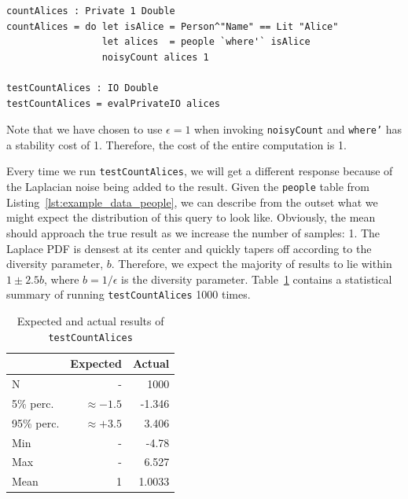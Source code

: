 \documentclass[12pt]{article}
\begin{document}
\begin{lstlisting}
countAlices : Private 1 Double
countAlices = do let isAlice = Person^"Name" == Lit "Alice"
                 let alices  = people `where'` isAlice
                 noisyCount alices 1

testCountAlices : IO Double
testCountAlices = evalPrivateIO alices
\end{lstlisting}

Note that we have chosen to use $\epsilon = 1$ when invoking \texttt{noisyCount} and \texttt{where'} has a stability cost of 1.
Therefore, the cost of the entire computation is 1.

Every time we run \texttt{testCountAlices}, we will get a different response because of the Laplacian noise being added to the result.
Given the \texttt{people} table from Listing~\ref{lst:example_data_people}, we can describe from the outset what we might expect the distribution of this query to look like.
Obviously, the mean should approach the true result as we increase the number of samples: 1.
The Laplace PDF is densest at its center and quickly tapers off according to the diversity parameter, $b$.
Therefore, we expect the majority of results to lie within $1 \pm 2.5b$, where $b=1/\epsilon$ is the diversity parameter.
Table~\ref{tab:testCountAlices_results} contains a statistical summary of running \texttt{testCountAlices} 1000 times.

\begin{table}[h!]
  \caption{Expected and actual results of \texttt{testCountAlices}}
  \label{tab:testCountAlices_results}
  \centering

  \begin{tabular}{|l|rr|}
  \hline

  \hline
  \textbf{} & \textbf{Expected} & \textbf{Actual} \\
  \hline
    N          &             -  &   1000 \\
    5\% perc.  & $\approx -1.5$ & -1.346 \\
    95\% perc. & $\approx +3.5$ &  3.406 \\
    Min        &             -  &  -4.78 \\
    Max        &             -  &  6.527 \\
    Mean       &             1  & 1.0033 \\
  \hline

  \hline
  \end{tabular}
\end{table}
\end{document}
